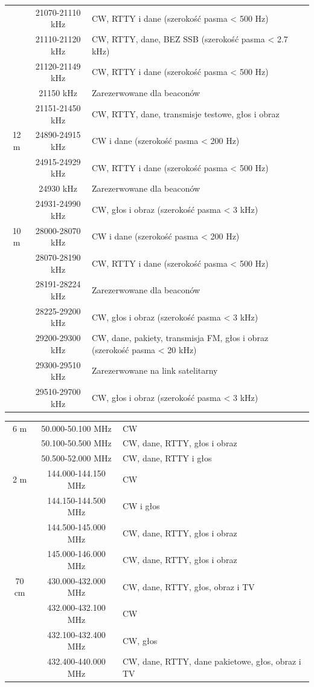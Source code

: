 \documentclass[a4paper,11pt]{article}
\begin{document}
\begin{center}
\begin{tabular}{| c | c | p{8cm} |}
 & 21070-21110 kHz & CW, RTTY i dane (szerokość pasma < 500 Hz) \\ \cline{2-3}
 & 21110-21120 kHz & CW, RTTY, dane, BEZ SSB (szerokość pasma < 2.7 kHz) \\ \cline{2-3}
 & 21120-21149 kHz & CW, RTTY i dane (szerokość pasma < 500 Hz) \\ \cline{2-3}
 & 21150 kHz & Zarezerwowane dla beaconów \\ \cline{2-3}
 & 21151-21450 kHz & CW, RTTY, dane, transmisje testowe, głos i obraz \\ \hline
12 m & 24890-24915 kHz & CW i dane (szerokość pasma < 200 Hz) \\ \cline{2-3}
 & 24915-24929 kHz & CW, RTTY i dane (szerokość pasma < 500 Hz) \\ \cline{2-3}
 & 24930 kHz & Zarezerwowane dla beaconów \\ \cline{2-3}
 & 24931-24990 kHz & CW, głos i obraz (szerokość pasma < 3 kHz) \\ \hline
10 m & 28000-28070 kHz & CW i dane (szerokość pasma < 200 Hz) \\ \cline{2-3}
 & 28070-28190 kHz & CW, RTTY i dane (szerokość pasma < 500 Hz) \\ \cline{2-3}
 & 28191-28224 kHz & Zarezerwowane dla beaconów \\ \cline{2-3}
 & 28225-29200 kHz & CW, głos i obraz (szerokość pasma < 3 kHz) \\ \cline{2-3}
 & 29200-29300 kHz & CW, dane, pakiety, transmisja FM, głos i obraz (szerokość pasma < 20 kHz) \\ \cline{2-3}
 & 29300-29510 kHz & Zarezerwowane na link satelitarny \\ \cline{2-3}
 & 29510-29700 kHz & CW, głos i obraz (szerokość pasma < 3 kHz) \\ \hline
\end{tabular}
\end{center}
\begin{center}
\begin{tabular}{| c | c | p{8cm} |}
\hline
6 m & 50.000-50.100 MHz & CW \\ \cline{2-3}
 & 50.100-50.500 MHz & CW, dane, RTTY, głos i obraz \\ \cline{2-3}
 & 50.500-52.000 MHz & CW, dane, RTTY i głos \\ \hline
2 m & 144.000-144.150 MHz & CW \\ \cline{2-3}
 & 144.150-144.500 MHz & CW i głos \\ \cline{2-3}
 & 144.500-145.000 MHz & CW, dane, RTTY, głos i obraz \\ \cline{2-3}
 & 145.000-146.000 MHz & CW, dane, RTTY, głos i obraz \\ \hline
70 cm & 430.000-432.000 MHz & CW, dane, RTTY, głos, obraz i TV \\ \cline{2-3}
 & 432.000-432.100 MHz & CW \\ \cline{2-3}
 & 432.100-432.400 MHz & CW, głos \\ \cline{2-3}
 & 432.400-440.000 MHz & CW, dane, RTTY, dane pakietowe, głos, obraz i TV \\ \hline
\end{tabular}
\end{center}
\end{document}
